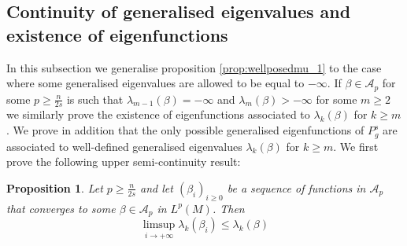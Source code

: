 \documentclass[10pt]{amsart}
\numberwithin{equation}{section}
\theoremstyle{plain}
\newtheorem{prop}[theo]{Proposition}%
\theoremstyle{remark}
\begin{document}
\subsection{Continuity of generalised eigenvalues and existence of eigenfunctions}
In this subsection we generalise proposition \ref{prop:wellposedmu_1} to the case where some generalised eigenvalues are allowed to be equal to $-\infty$. If $\beta \in \mathcal{A}_p$ for some $p \ge \frac{n}{2s}$ is such that  $\lambda_{m-1}(\beta) = -\infty$ and $\lambda_m(\beta) >- \infty$ for some $m \geq 2$ we similarly prove the existence of eigenfunctions associated to $\lambda_k(\beta)$ for $k\geq m$. We prove in addition that the only possible generalised eigenfunctions of $P_g^s$ are associated to well-defined generalised eigenvalues $\lambda_k(\beta)$ for $k \ge m$. We first prove the following upper semi-continuity result:

\begin{prop} \label{prop:uppersemicontinuity}
Let $p \ge \frac{n}{2s}$ and let  $(\beta_i)_{i\ge0}$ be a sequence of functions in $\mathcal{A}_p$ that converges to some $\beta \in \mathcal{A}_p$ in $L^p(M)$. Then
$$ \limsup_{i\to +\infty} \lambda_k(\beta_i) \leq \lambda_k(\beta) $$
\end{prop}
\end{document}
